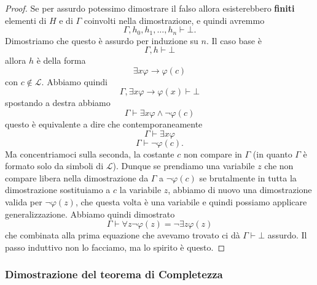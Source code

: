\documentclass[11pt]{scrartcl}
\begin{document}
 	\begin{proof}
 		Se per assurdo potessimo dimostrare il falso allora esisterebbero \textbf{finiti} elementi di $H$ e di $\Gamma$ coinvolti nella dimostrazione, e quindi avremmo
 		$$\Gamma,h_0,h_1,\dots,h_n\vdash \bot.$$
 		Dimostriamo che questo è assurdo per induzione su $n$. Il caso base è
 		$$\Gamma,h\vdash\bot$$
 		allora $h$ è della forma
 		$$\exists x\varphi \to \varphi(c)$$
 		con $c\not\in \mathcal{L}$. Abbiamo quindi
 		$$\Gamma,\exists x\varphi \to \varphi(x)\vdash \bot$$
 		spostando a destra abbiamo
 		$$\Gamma \vdash \exists x\varphi \land \lnot \varphi(c)$$
 		questo è equivalente a dire che contemporaneamente
 		$$\Gamma \vdash \exists x\varphi$$
 		$$\Gamma \vdash \lnot\varphi(c).$$
 		Ma concentriamoci sulla seconda, la costante $c$ non compare in $\Gamma$ (in quanto $\Gamma$ è formato solo da simboli di $\mathcal{L}$). Dunque se prendiamo una variabile $z$ che non compare libera nella dimostrazione da $\Gamma$ a $\lnot \varphi(c)$ se brutalmente in tutta la dimostrazione sostituiamo a $c$ la variabile $z$, abbiamo di nuovo una dimostrazione valida per $\lnot \varphi(z)$, che questa volta è una variabile e quindi possiamo applicare generalizzazione. Abbiamo quindi dimostrato
 		$$\Gamma\vdash \forall z \lnot \varphi(z)=\lnot \exists z\varphi(z)$$
 		che combinata alla prima equazione che avevamo trovato ci dà $\Gamma\vdash \bot $ assurdo. Il passo induttivo non lo facciamo, ma lo spirito è questo.
 	\end{proof}
 	
 	\subsubsection{Dimostrazione del teorema di Completezza}
 	
\end{document}
